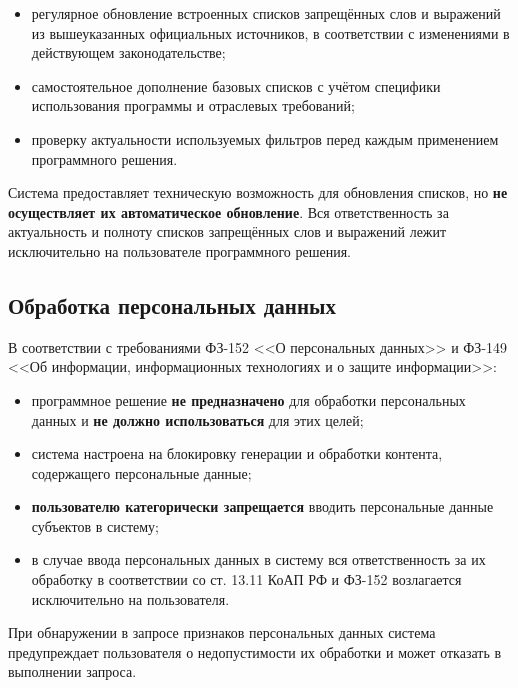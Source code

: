 \begin{itemize}
	\item регулярное обновление встроенных списков запрещённых слов и выражений из вышеуказанных официальных источников, в соответствии с изменениями в действующем законодательстве;
	\item самостоятельное дополнение базовых списков с учётом специфики использования программы и отраслевых требований;
	\item проверку актуальности используемых фильтров перед каждым применением программного решения.
\end{itemize}

Система предоставляет техническую возможность для обновления списков, но \textbf{не осуществляет их автоматическое обновление}. Вся ответственность за актуальность и полноту списков запрещённых слов и выражений лежит исключительно на пользователе программного решения.

\subsection{Обработка персональных данных}
В соответствии с требованиями ФЗ-152 <<О персональных данных>> и \mbox{ФЗ-149} <<Об информации, информационных технологиях и о защите информации>>:

\begin{itemize}
	\item программное решение \textbf{не предназначено} для обработки персональных данных и \textbf{не должно использоваться} для этих целей;
	\item система настроена на блокировку генерации и обработки контента, содержащего персональные данные;
	\item \textbf{пользователю категорически запрещается} вводить персональные данные субъектов в систему;
	\item в случае ввода персональных данных в систему вся ответственность за их обработку в соответствии со ст. 13.11 КоАП РФ и ФЗ-152 возлагается исключительно на пользователя.
\end{itemize}

При обнаружении в запросе признаков персональных данных система предупреждает пользователя о недопустимости их обработки и может отказать в выполнении запроса.

